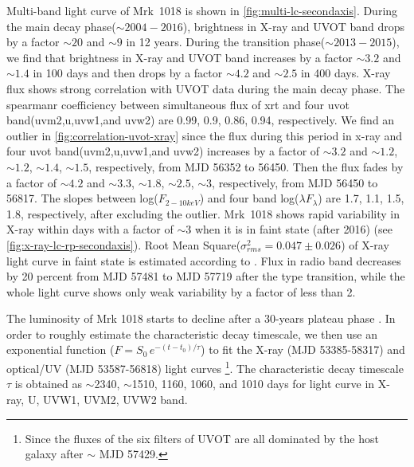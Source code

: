 \documentclass[twocolumn]{aastex63}
\begin{document}
Multi-band light curve of Mrk~1018 is shown in \autoref{fig:multi-lc-secondaxis}. During the main decay phase($\sim 2004-2016$), brightness in X-ray and UVOT band drops by a factor $\sim20$ and $\sim9$ in 12 years. During the transition phase($\sim 2013-2015$), we find that brightness in X-ray and UVOT band increases by a factor $\sim3.2$ and $\sim1.4$ in 100 days and then drops by a factor $\sim4.2$ and $\sim2.5$ in 400 days. X-ray flux shows strong correlation with UVOT data during the main decay phase. The spearmanr coefficiency between simultaneous flux of xrt and four uvot band(uvm2,u,uvw1,and uvw2) are 0.99, 0.9, 0.86, 0.94, respectively. We find an outlier in \autoref{fig:correlation-uvot-xray} since the flux during this period in x-ray and four uvot band(uvm2,u,uvw1,and uvw2) increases by a factor of $\sim 3.2$ and $\sim 1.2$, $\sim 1.2$, $\sim 1.4$, $\sim 1.5$, respectively, from MJD 56352 to 56450. Then the flux fades by a factor of $\sim 4.2$ and $\sim 3.3$, $\sim 1.8$, $\sim 2.5$, $\sim 3$, respectively, from MJD 56450 to 56817. The slopes between log($F_{2-10keV}$) and four band log($\lambda F_{\lambda}$) are 1.7, 1.1, 1.5, 1.8, respectively, after excluding the outlier. Mrk~1018 shows rapid variability in X-ray within days with a factor of $\sim3$ when it is in faint state (after 2016) (see \autoref{fig:x-ray-lc-rp-secondaxis}). Root Mean Square($\sigma^2_{rms} = 0.047 \pm 0.026 $) of X-ray light curve in faint state is estimated according to \citet{1999ApJ...524..667T}. Flux in radio band decreases by 20 percent from MJD 57481 to MJD 57719 after the type transition, while the whole light curve shows only weak variability by a factor of less than 2.

 The luminosity of Mrk 1018 starts to decline after a 30-years plateau phase \citep[see][]{2016A&A...593L...8M}. In order to roughly estimate the characteristic decay timescale, we then use an exponential function ($F=S_0\,e^{-(t-t_0)/\tau }$) to fit the X-ray (MJD 53385-58317) and optical/UV (MJD 53587-56818) light curves \footnote{Since the fluxes of the six filters of UVOT are all dominated by the host galaxy after $\sim$ MJD 57429. }. The characteristic decay timescale $\tau$ is obtained as $\sim$2340, $\sim$1510, 1160, 1060, and 1010 days for light curve in X-ray, U, UVW1, UVM2, UVW2 band. 
 
\end{document}
